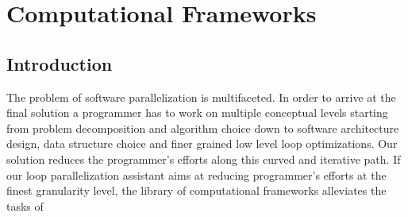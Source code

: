 \chapter{Computational Frameworks}
\label{frameworks}

\section{Introduction}
\label{frameworks_introduction}
\quad The problem of software parallelization is multifaceted. In order to arrive at the final solution a programmer has to work on multiple conceptual levels starting from problem decomposition and algorithm choice down to software architecture design, data structure choice and finer grained low level loop optimizations. Our solution reduces the programmer's efforts along this curved and iterative path. If our loop parallelization assistant aims at reducing programmer's efforts at the finest granularity level, the library of computational frameworks alleviates the tasks of 

